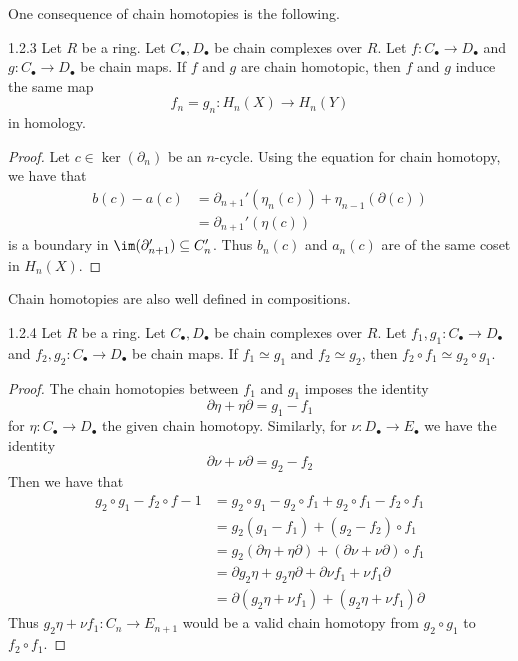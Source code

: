 \documentclass[a4paper]{article}
\begin{document}
One consequence of chain homotopies is the following. 

\begin{lmm}{}{1.2.3} Let $R$ be a ring. Let $C_\bullet,D_\bullet$ be chain complexes over $R$. Let $f:C_\bullet\to D_\bullet$ and $g:C_\bullet\to D_\bullet$ be chain maps. If $f$ and $g$ are chain homotopic, then $f$ and $g$ induce the same map $$f_n=g_n:H_n(X)\to H_n(Y)$$ in homology. 
\begin{proof}
Let $c\in\ker(\partial_n)$ be an $n$-cycle. Using the equation for chain homotopy, we have that 
\begin{align*}
b(c)-a(c)&=\partial_{n+1}'(\eta_n(c))+\eta_{n-1}(\partial(c))\\
&=\partial_{n+1}'(\eta(c))
\end{align*}
 is a boundary in $\im(\partial_{n+1}')\subseteq C_n'$. Thus $b_n(c)$ and $a_n(c)$ are of the same coset in $H_n(X)$. 
\end{proof}
\end{lmm}

Chain homotopies are also well defined in compositions. 

\begin{prp}{}{1.2.4} Let $R$ be a ring. Let $C_\bullet,D_\bullet$ be chain complexes over $R$. Let $f_1,g_1:C_\bullet\to D_\bullet$ and $f_2,g_2:C_\bullet\to D_\bullet$ be chain maps. If $f_1\simeq g_1$ and $f_2\simeq g_2$, then $f_2\circ f_1\simeq g_2\circ g_1$. 
\begin{proof}
The chain homotopies between $f_1$ and $g_1$ imposes the identity $$\partial\eta+\eta\partial=g_1-f_1$$ for $\eta:C_\bullet\to D_\bullet$ the given chain homotopy. Similarly, for $\nu:D_\bullet\to E_\bullet$ we have the identity $$\partial\nu+\nu\partial=g_2-f_2$$ Then we have that 
\begin{align*}
g_2\circ g_1-f_2\circ f-1&=g_2\circ g_1-g_2\circ f_1+g_2\circ f_1-f_2\circ f_1\\
&=g_2(g_1-f_1)+(g_2-f_2)\circ f_1\\
&=g_2(\partial\eta+\eta\partial)+(\partial\nu+\nu\partial)\circ f_1\\
&=\partial g_2\eta+g_2\eta\partial+\partial\nu f_1+\nu f_1\partial\\
&=\partial(g_2\eta+\nu f_1)+(g_2\eta+\nu f_1)\partial
\end{align*}
Thus $g_2\eta+\nu f_1:C_n\to E_{n+1}$ would be a valid chain homotopy from $g_2\circ g_1$ to $f_2\circ f_1$. 
\end{proof}
\end{prp}
\end{document}
